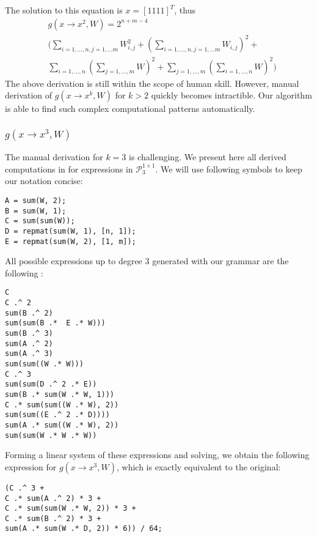 The solution to this equation is $x=[1 1 1 1]^T$, thus 
\begin{align*}
	&g(x \rightarrow x^2, W) = 2^{n + m - 4} \\ 
 &\Big(\sum_{i = 1, \dots, n, j = 1, \dots m} W_{i, j}^2 + (\sum_{i = 1, \dots, n, j = 1, \dots m} W_{i, j})^2 + \\
 &\sum_{i = 1, \dots, n}(\sum_{j = 1, \dots, m} W)^2 + \sum_{j = 1, \dots, m}(\sum_{i = 1, \dots, n} W)^2 \Big)
\end{align*}
The above derivation is still within the scope of human skill. However, manual derivation
of $g(x \rightarrow x^k, W)$ for $k > 2$ quickly becomes intractible. Our algorithm
is able to find such complex computational patterns automatically. 

\subsubsection{$g(x \rightarrow x^3, W)$}
The manual derivation for $k = 3$ is challenging. We present here all derived computations in
for expressions in $\mathcal{P}^{1 \times 1}_3$. We will use following symbols to keep our notation
concise:
\begin{lstlisting}
A = sum(W, 2);
B = sum(W, 1);
C = sum(sum(W));
D = repmat(sum(W, 1), [n, 1]);
E = repmat(sum(W, 2), [1, m]);
\end{lstlisting}

All possible expressions up to degree $3$ generated with our grammar
are the following : 
\begin{lstlisting}
C
C .^ 2
sum(B .^ 2) 
sum(sum(B .*  E .* W))) 
sum(B .^ 3)
sum(A .^ 2)
sum(A .^ 3)
sum(sum((W .* W)))
C .^ 3
sum(sum(D .^ 2 .* E))
sum(B .* sum(W .* W, 1)))
C .* sum(sum((W .* W), 2))
sum(sum((E .^ 2 .* D)))) 
sum(A .* sum((W .* W), 2))
sum(sum(W .* W .* W))
\end{lstlisting}

Forming a linear system of these expressions and solving, we obtain
the following expression for $g(x \rightarrow x^3, W)$, which is
exactly equivalent to the original:
\begin{lstlisting}
(C .^ 3 + 
C .* sum(A .^ 2) * 3 +
C .* sum(sum(W .* W, 2)) * 3 +
C .* sum(B .^ 2) * 3 + 
sum(A .* sum(W .* D, 2)) * 6)) / 64;
\end{lstlisting}

